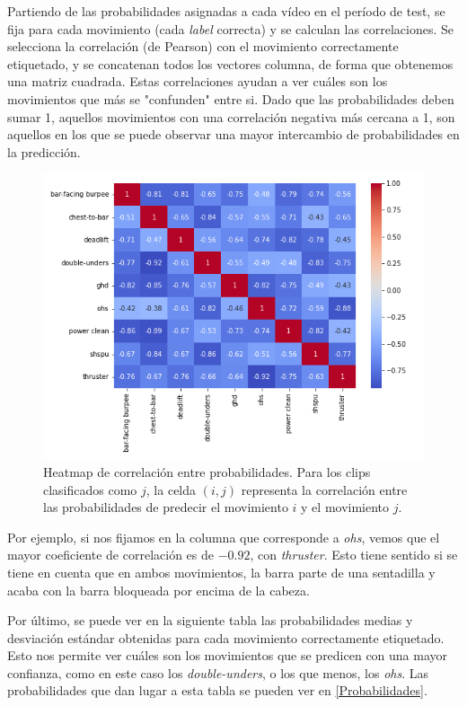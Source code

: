 Partiendo de las probabilidades asignadas a cada vídeo en el período de test, se fija para cada movimiento (cada \textit{label} correcta) y se calculan las correlaciones. Se selecciona la correlación (de Pearson) con el movimiento correctamente etiquetado, y se concatenan todos los vectores columna, de forma que obtenemos una matriz cuadrada. Estas correlaciones ayudan a ver cuáles son los movimientos que más se "confunden" entre si. Dado que las probabilidades deben sumar 1, aquellos movimientos con una correlación negativa más cercana a 1, son aquellos en los que se puede observar una mayor intercambio de probabilidades en la predicción.

\begin{figure}[H]
    \centering
		\includegraphics[width=\textwidth]{figs/heatmap_correlations.png}
\caption{Heatmap de correlación entre probabilidades. Para los clips clasificados como $j$, la celda $(i, j)$ representa la correlación entre las probabilidades de predecir el movimiento $i$ y el movimiento $j$.}\label{heatmap_correlations}
\end{figure}

Por ejemplo, si nos fijamos en la columna que corresponde a \textit{ohs}, vemos que el mayor coeficiente de correlación es de $-0.92$, con \textit{thruster}. Esto tiene sentido si se tiene en cuenta que en ambos movimientos, la barra parte de una sentadilla y acaba con la barra bloqueada por encima de la cabeza.

Por último, se puede ver en la siguiente tabla las probabilidades medias y desviación estándar obtenidas para cada movimiento correctamente etiquetado. Esto nos permite ver cuáles son los movimientos que se predicen con una mayor confianza, como en este caso los \textit{double-unders}, o los que menos, los \textit{ohs}. Las probabilidades que dan lugar a esta tabla se pueden ver en \ref{Probabilidades}.


